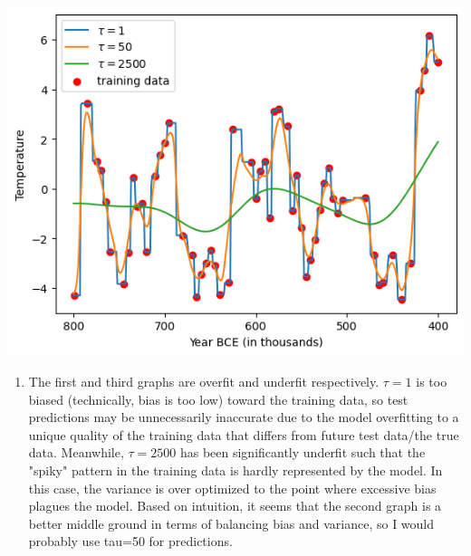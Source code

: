 \documentclass[submit]{harvardml}
\begin{document}
\begin{solution}

\noindent
\begin{center}
  \includegraphics[width=0.5\linewidth]{Problem1.png}
\end{center}

\begin{enumerate}
  \item 
  The first and third graphs are overfit and underfit respectively.
  $\tau = 1$ is too biased (technically, bias is too low) toward the training data, so test predictions may be
  unnecessarily inaccurate due to the model overfitting to a unique quality of
  the training data that differs from future test data/the true data.
  Meanwhile, $\tau = 2500$ has been significantly underfit such that 
  the "spiky" pattern in the training data is hardly represented by the model.
  In this case, the variance is over optimized to the point where excessive bias
  plagues the model.
  Based on intuition, it seems that the second graph is a better middle ground in terms of
  balancing bias and variance, so I would probably use tau=50 for predictions. 


\end{enumerate}
\end{solution}
\end{document}

